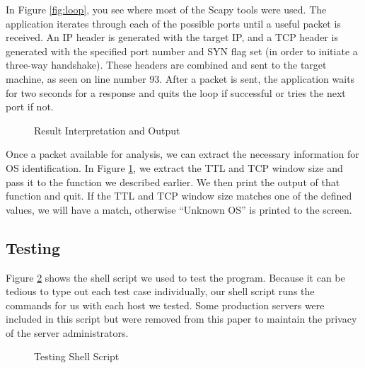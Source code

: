 In Figure \ref{fig:loop}, you see where most of the Scapy tools were used.  The application iterates through each of the possible ports until a useful packet is received.  An IP header is generated with the target IP, and a TCP header is generated with the specified port number and SYN flag set (in order to initiate a three-way handshake).  These headers are combined and sent to the target machine, as seen on line number 93.  After a packet is sent, the application waits for two seconds for a response and quits the loop if successful or tries the next port if not.

\begin{figure}
	\caption{\label{fig:results} Result Interpretation and Output}
\end{figure}

Once a packet available for analysis, we can extract the necessary information for OS identification. In Figure \ref{fig:results}, we extract the TTL and TCP window size and pass it to the function we described earlier.  We then print the output of that function and quit.  If the TTL and TCP window size matches one of the defined values, we will have a match, otherwise ``Unknown OS'' is printed to the screen.

\subsection{Testing}

Figure \ref{fig:testScript} shows the shell script we used to test the program.  Because it can be tedious to type out each test case individually, our shell script runs the commands for us with each host we tested.  Some production servers were included in this script but were removed from this paper to maintain the privacy of the server administrators.

\begin{figure}
	\caption{\label{fig:testScript} Testing Shell Script}
\end{figure}


